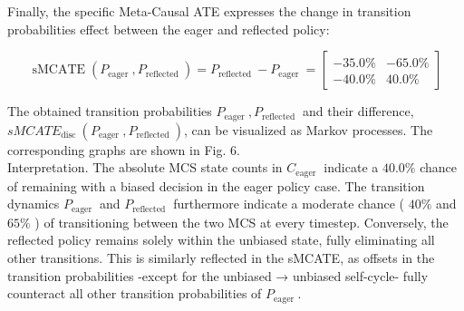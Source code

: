 \documentclass[10pt]{article}
\begin{document}
Finally, the specific Meta-Causal ATE expresses the change in transition probabilities effect between the eager and reflected policy:

\[
\operatorname{sMCATE}\left(P_{\text {eager }}, P_{\text {reflected }}\right)=P_{\text {reflected }}-P_{\text {eager }}=\left[\begin{array}{cc}
-35.0 \% & -65.0 \%  \tag{52}\\
-40.0 \% & 40.0 \%
\end{array}\right]
\]

The obtained transition probabilities $P_{\text {eager }}, P_{\text {reflected }}$ and their difference, $s M C A T E_{\text {disc }}\left(P_{\text {eager }}, P_{\text {reflected }}\right)$, can be visualized as Markov processes. The corresponding graphs are shown in Fig. 6.\\
Interpretation. The absolute MCS state counts in $C_{\text {eager }}$ indicate a $40.0 \%$ chance of remaining with a biased decision in the eager policy case. The transition dynamics $P_{\text {eager }}$ and $P_{\text {reflected }}$ furthermore indicate a moderate chance ( $40 \%$ and $65 \%$ ) of transitioning between the two MCS at every timestep. Conversely, the reflected policy remains solely within the unbiased state, fully eliminating all other transitions. This is similarly reflected in the sMCATE, as offsets in the transition probabilities -except for the unbiased → unbiased self-cycle- fully counteract all other transition probabilities of $P_{\text {eager }}$.
\end{document}
